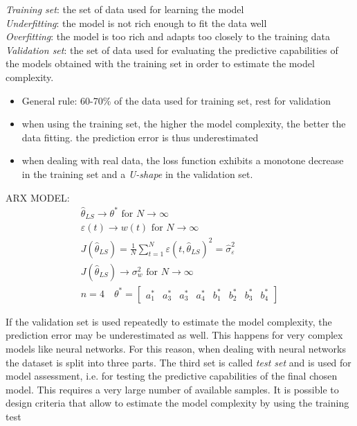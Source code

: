 \documentclass{book}
\begin{document}
\emph{Training set}: the set of data used for learning the model\\
\emph{Underfitting}: the model is not rich enough to fit the data well\\
\emph{Overfitting}: the model is too rich and adapts too closely to the training data\\
\emph{Validation set}: the set of data used for evaluating the predictive capabilities of the models obtained with the training set in order to estimate the model complexity.
\begin{itemize}
    \item General rule: 60-70\% of the data used for training set, rest for validation 
    \item when using the training set, the higher the model complexity, the better the data fitting. the prediction error is thus underestimated
    \item when dealing with real data, the loss function exhibits a monotone decrease in the training set and a \emph{U-shape} in the validation set.
\end{itemize}

ARX MODEL: 
\begin{gather*}
    \hat{\theta}_{LS} \to \theta^* \text{ for } N\to \infty\\
    \varepsilon(t) \to w(t) \text{ for } N\to\infty\\
    J(\hat{\theta}_{LS})=\displaystyle\frac{1}{N}\displaystyle\sum_{t=1}^{N}\varepsilon(t,\hat{\theta}_{LS})^2 = \hat{\sigma}_\varepsilon^2\\
    J(\hat{\theta}_{LS}) \to \sigma_w^2 \text{ for } N\to \infty\\
    n=4 \quad \theta^* = \begin{bmatrix}
        a_1^* & a_3^* & a_3^* & a_4^* & b_1^* &  b_2^* & b_3^* & b_4^*
    \end{bmatrix}
\end{gather*}

If the validation set is used repeatedly to estimate the model complexity, the prediction error may be underestimated as well. This happens for very complex models like neural networks. For this reason, when dealing with neural networks the dataset is split into three parts. The third set is called \emph{test set} and is used for model assessment, i.e. for testing the predictive capabilities of the final chosen model. This requires a very large number of available samples. It is possible to design criteria that allow to estimate the model complexity by using the training test
\end{document}

